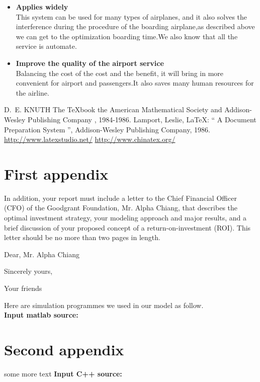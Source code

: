 \documentclass{mcmthesis}
\begin{document}
\begin{itemize}
\item \textbf{Applies widely}\\
This  system can be used for many types of airplanes, and it also
solves the interference during  the procedure of the boarding
airplane,as described above we can get to the  optimization
boarding time.We also know that all the service is automate.

\item \textbf{Improve the quality of the airport service}\\
Balancing the cost of the cost and the benefit, it will bring in
more convenient  for airport and passengers.It also saves many
human resources for the airline.
\end{itemize}

\begin{thebibliography}{99}
 D.~E. KNUTH   The \TeX{}book  the American
Mathematical Society and Addison-Wesley
Publishing Company , 1984-1986.
Lamport, Leslie,  \LaTeX{}: `` A Document Preparation System '',
Addison-Wesley Publishing Company, 1986.
\url{http://www.latexstudio.net/}
\url{http://www.chinatex.org/}
\end{thebibliography}

\begin{appendices}

\section{First appendix}

In addition, your report must include a letter to the Chief Financial Officer (CFO) of the Goodgrant Foundation, Mr. Alpha Chiang, that describes the optimal investment strategy, your modeling approach and major results, and a brief discussion of your proposed concept of a return-on-investment (ROI). This letter should be no more than two pages in length.

\begin{letter}{Dear, Mr. Alpha Chiang}

\lipsum[1-2]

\vspace{\parskip}

Sincerely yours,

Your friends

\end{letter}
Here are simulation programmes we used in our model as follow.\\

\textbf{\textcolor[rgb]{0.98,0.00,0.00}{Input matlab source:}}


\section{Second appendix}

some more text \textcolor[rgb]{0.98,0.00,0.00}{\textbf{Input C++ source:}}


\end{appendices}
\end{document}
